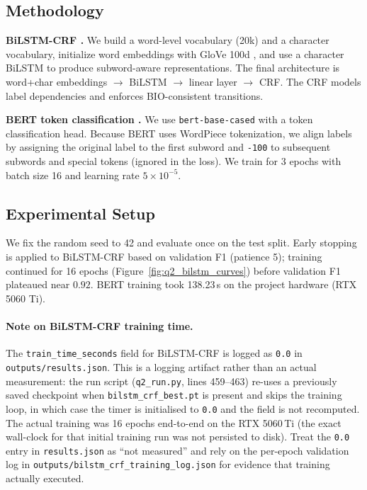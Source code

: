 \subsection{Methodology}
\textbf{BiLSTM-CRF \citep{Lample2016bilstm}.} We build a word-level vocabulary (20k) and a character vocabulary, initialize word embeddings with GloVe 100d \citep{Pennington2014glove}, and use a character BiLSTM to produce subword-aware representations. The final architecture is word+char embeddings $\rightarrow$ BiLSTM $\rightarrow$ linear layer $\rightarrow$ CRF. The CRF models label dependencies and enforces BIO-consistent transitions.

\textbf{BERT token classification \citep{Devlin2019bert}.} We use \texttt{bert-base-cased} with a token classification head. Because BERT uses WordPiece tokenization, we align labels by assigning the original label to the first subword and \texttt{-100} to subsequent subwords and special tokens (ignored in the loss). We train for 3 epochs with batch size 16 and learning rate $5\times10^{-5}$.

\subsection{Experimental Setup}
We fix the random seed to 42 and evaluate once on the test split. Early stopping is applied to BiLSTM-CRF based on validation F1 (patience 5); training continued for 16 epochs (Figure~\ref{fig:q2_bilstm_curves}) before validation F1 plateaued near $0.92$. BERT training took 138.23\,s on the project hardware (RTX 5060 Ti).

\paragraph{Note on BiLSTM-CRF training time.} The \texttt{train\_time\_seconds} field for BiLSTM-CRF is logged as \texttt{0.0} in \texttt{outputs/results.json}. This is a logging artifact rather than an actual measurement: the run script (\texttt{q2\_run.py}, lines 459--463) re-uses a previously saved checkpoint when \texttt{bilstm\_crf\_best.pt} is present and skips the training loop, in which case the timer is initialised to \texttt{0.0} and the field is not recomputed. The actual training was 16 epochs end-to-end on the RTX 5060\,Ti (the exact wall-clock for that initial training run was not persisted to disk). Treat the \texttt{0.0} entry in \texttt{results.json} as ``not measured'' and rely on the per-epoch validation log in \texttt{outputs/bilstm\_crf\_training\_log.json} for evidence that training actually executed.

